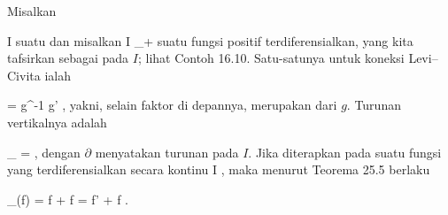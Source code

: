{

Misalkan

\mavergleichskette
{\vergleichskette
{ I
}
{ \subseteq }{ \R
}
{  }{
}
{    }{
}
{   }{
}
}
{}{}{}
suatu
dan misalkan
 { I } {\R_+
} {}
suatu fungsi positif terdiferensialkan, yang kita tafsirkan sebagai
pada $I$; lihat
Contoh 16.10.
Satu-satunya
untuk koneksi Levi--Civita ialah

\mavergleichskettedisp
{\vergleichskette
{ \Gamma
}
{ =} { {  }  g^{-1} g'
}
{ } {
}
{ } {
}
{ } {
}
}
{}{}{,}
yakni, selain faktor di depannya, merupakan
dari $g$. Turunan vertikalnya adalah

\mavergleichskettedisp
{\vergleichskette
{ \nabla_\partial \partial
}
{ =} { {  } \partial
}
{ } {
}
{ } {
}
{ } {
}
}
{}{}{,}
dengan $\partial$ menyatakan turunan pada $I$. Jika diterapkan pada suatu fungsi yang terdiferensialkan secara kontinu
 { I } {\R
} {}
 {} {,}
maka menurut
Teorema 25.5
berlaku

\mavergleichskettedisp
{\vergleichskette
{ \nabla_\partial (f)
}
{ =} { \partial f + f  {  }
}
{ =} { f' + f {  }
}
{ } {
}
{ } {
}
}
{}{}{.}

}



